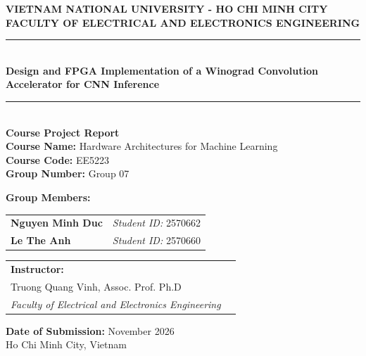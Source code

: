 \documentclass[12pt,a4paper]{article}
\begin{document}
\begin{titlepage}
    \centering
    \vspace*{0.5cm}

    {\Large \textbf{VIETNAM NATIONAL UNIVERSITY - HO CHI MINH CITY}}\\[0.2cm]
    {\large \textbf{FACULTY OF ELECTRICAL AND ELECTRONICS ENGINEERING}}\\[1.5cm]

    \rule{\linewidth}{1.5pt}\\[0.5cm]
    {\huge \bfseries Design and FPGA Implementation of a Winograd Convolution Accelerator for CNN Inference}\\[0.4cm]
    \rule{\linewidth}{1.5pt}\\[1.5cm]

    \textbf{\Large Course Project Report}\\[0.3cm]
    {\large \textbf{Course Name:} Hardware Architectures for Machine Learning}\\[0.15cm]
    {\large \textbf{Course Code:} EE5223}\\[0.15cm]
    {\large \textbf{Group Number:} Group 07}\\[1.8cm]

    \begin{minipage}[t]{0.48\textwidth}
        \textbf{\large Group Members:}\\[0.3cm]
        \begin{tabular}{ll}
            \textbf{Nguyen Minh Duc} & \textit{Student ID:} 2570662 \\
            \textbf{Le The Anh}      & \textit{Student ID:} 2570660 \\
        \end{tabular}
    \end{minipage}
    \vfill
    \begin{minipage}[t]{0.45\textwidth}
        \begin{tabular}{ll}
            \textbf{\large Instructor:}                 \\[0.3cm]
            \large Truong Quang Vinh, Assoc. Prof. Ph.D \\[0.15cm]
            \textit{Faculty of Electrical and Electronics Engineering}
        \end{tabular}
    \end{minipage}

    \vfill
    {\large \textbf{Date of Submission:} November 2026}\\[0.3cm]
    {\large Ho Chi Minh City, Vietnam}
\end{titlepage}
\end{document}
